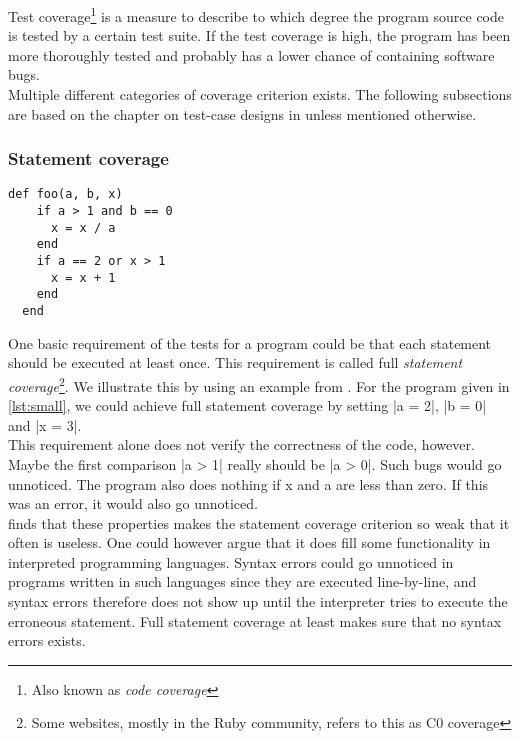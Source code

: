 \MakeShortVerb{\|}

Test coverage\footnote{Also known as \emph{code coverage}} is a measure
to describe to which degree the program source code is tested by a
certain test suite. If the test coverage is high, the program has been
more thoroughly tested and probably has a lower chance of containing
software bugs.\cite{wiki:coverage}\\

Multiple different categories of coverage criterion exists. The
following subsections are based on the chapter on test-case designs in
\citet{book:art_of_testing} unless mentioned otherwise.\\


\subsubsection{Statement coverage}

\begin{lstlisting}[caption=A small example program,
                   label=lst:small, float=t]
  def foo(a, b, x)
    if a > 1 and b == 0
      x = x / a
    end
    if a == 2 or x > 1
      x = x + 1
    end
  end
\end{lstlisting}

One basic requirement of the tests for a program could be that each
statement should be executed at least once. This requirement is called
full \emph{statement coverage}\footnote{Some websites, mostly in the
Ruby community, refers to this as C0 coverage}. We illustrate this by
using an example from \citet{book:art_of_testing}. For the program given
in \ref{lst:small}, we could achieve full statement coverage by setting
|a = 2|, |b = 0| and |x = 3|.\\

This requirement alone does not verify the correctness of the code,
however. Maybe the first comparison |a > 1| really should be |a > 0|.
Such bugs would go unnoticed. The program also does nothing if x and a
are less than zero. If this was an error, it would also go unnoticed.\\

\citeauthor{book:art_of_testing} finds that these properties makes the
statement coverage criterion so weak that it often is useless. One could
however argue that it does fill some functionality in interpreted
programming languages. Syntax errors could go unnoticed in programs
written in such languages since they are executed line-by-line, and
syntax errors therefore does not show up until the interpreter tries to
execute the erroneous statement. Full statement coverage at least makes
sure that no syntax errors exists.\\


